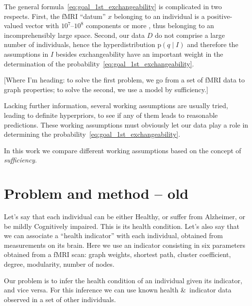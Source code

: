 \documentclass[\ifafour a4paper,12pt,\else a5paper,10pt,\fi%
onecolumn,oneside,article,%
british%
]{memoir}
\theoremstyle{remark}
\theoremstyle{innote}
\newcommand*{\citep}{\parencites}
\newcommand*{\amp}{\&}
\newcommand*{\pf}{\mathrm{p}}%
\renewcommand*{\|}{\mathpunct{|}}
\newcommand*{\yD}{D}
\newcommand*{\yx}{x}
\newcommand*{\yp}{q}
\newcommand*{\yI}{I}
\theoremstyle{plain}
\begin{document}
The general formula~\eqref{eq:goal_1st_exchangeability} is complicated in
two respects. First, the fMRI \enquote{datum} $\yx$ belonging to an
individual is a positive-valued vector with $10^7$--$10^8$ components or
more \citep{lindquist2008}, thus belonging to an incomprehensibly large
space. Second, our data $\yD$ do not comprise a large number of
individuals, hence the hyperdistribution $\pf(\yp \|\yI)$ and therefore the
assumptions in $\yI$ besides exchangeability have an important weight in
the determination of the probability~\eqref{eq:goal_1st_exchangeability}.

[Where I'm heading: to solve the first problem, we go from a set of fMRI
data to graph properties; to solve the second, we use a model by sufficiency.]

Lacking further information, several working assumptions are usually tried,
leading to definite hyperpriors, to see if any of them leads to reasonable
predictions. These working assumptions must obviously let our data play a
role in determining the probability~\eqref{eq:goal_1st_exchangeability}.

In this work we compare different working assumptions based on the concept
of \emph{sufficiency}.



\section{Problem and method -- old}

Let's say that each individual can be either Healthy, or suffer from
Alzheimer, or be mildly Cognitively impaired. This is its health condition.
Let's also say that we can associate a \enquote{health indicator} with each
individual, obtained from measurements on its brain. Here we use an
indicator consisting in six parameters obtained from a fMRI scan: graph
weights, shortest path, cluster coefficient, degree, modularity, number of
nodes.

Our problem is to infer the health condition of an individual given its
indicator, and vice versa. For this inference we can use known health \amp\
indicator data observed in a set of other individuals.
\end{document}
